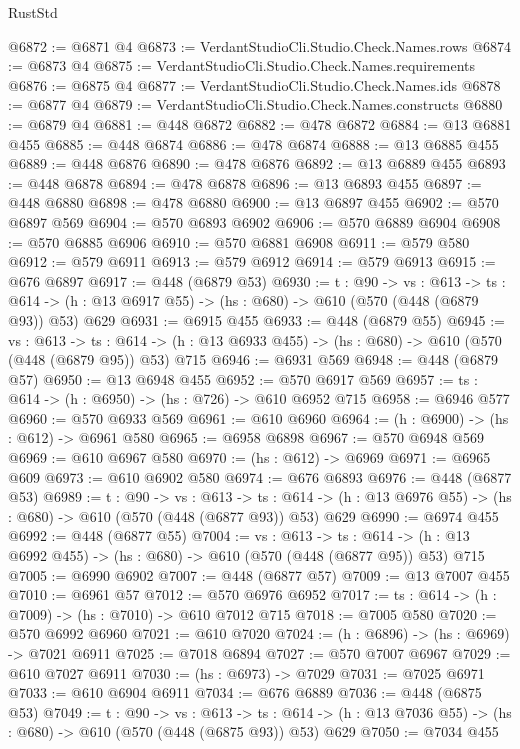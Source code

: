 \begin{lexlean}{RustStd}
\begin{coremodule}
@6872 := @6871 @4
@6873 := VerdantStudioCli.Studio.Check.Names.rows
@6874 := @6873 @4
@6875 := VerdantStudioCli.Studio.Check.Names.requirements
@6876 := @6875 @4
@6877 := VerdantStudioCli.Studio.Check.Names.ids
@6878 := @6877 @4
@6879 := VerdantStudioCli.Studio.Check.Names.constructs
@6880 := @6879 @4
@6881 := @448 @6872
@6882 := @478 @6872
@6884 := @13 @6881 @455
@6885 := @448 @6874
@6886 := @478 @6874
@6888 := @13 @6885 @455
@6889 := @448 @6876
@6890 := @478 @6876
@6892 := @13 @6889 @455
@6893 := @448 @6878
@6894 := @478 @6878
@6896 := @13 @6893 @455
@6897 := @448 @6880
@6898 := @478 @6880
@6900 := @13 @6897 @455
@6902 := @570 @6897 @569
@6904 := @570 @6893 @6902
@6906 := @570 @6889 @6904
@6908 := @570 @6885 @6906
@6910 := @570 @6881 @6908
@6911 := @579 @580
@6912 := @579 @6911
@6913 := @579 @6912
@6914 := @579 @6913
@6915 := @676 @6897
@6917 := @448 (@6879 @53)
@6930 := {t : @90} ->
  {vs : @613} ->
  {ts : @614} -> (h : @13 @6917 @55) -> (hs : @680) -> @610 (@570 (@448 (@6879 @93)) @53) @629
@6931 := @6915 @455
@6933 := @448 (@6879 @55)
@6945 := {vs : @613} ->
  {ts : @614} -> (h : @13 @6933 @455) -> (hs : @680) -> @610 (@570 (@448 (@6879 @95)) @53) @715
@6946 := @6931 @569
@6948 := @448 (@6879 @57)
@6950 := @13 @6948 @455
@6952 := @570 @6917 @569
@6957 := {ts : @614} -> (h : @6950) -> (hs : @726) -> @610 @6952 @715
@6958 := @6946 @577
@6960 := @570 @6933 @569
@6961 := @610 @6960
@6964 := (h : @6900) -> (hs : @612) -> @6961 @580
@6965 := @6958 @6898
@6967 := @570 @6948 @569
@6969 := @610 @6967 @580
@6970 := (hs : @612) -> @6969
@6971 := @6965 @609
@6973 := @610 @6902 @580
@6974 := @676 @6893
@6976 := @448 (@6877 @53)
@6989 := {t : @90} ->
  {vs : @613} ->
  {ts : @614} -> (h : @13 @6976 @55) -> (hs : @680) -> @610 (@570 (@448 (@6877 @93)) @53) @629
@6990 := @6974 @455
@6992 := @448 (@6877 @55)
@7004 := {vs : @613} ->
  {ts : @614} -> (h : @13 @6992 @455) -> (hs : @680) -> @610 (@570 (@448 (@6877 @95)) @53) @715
@7005 := @6990 @6902
@7007 := @448 (@6877 @57)
@7009 := @13 @7007 @455
@7010 := @6961 @57
@7012 := @570 @6976 @6952
@7017 := {ts : @614} -> (h : @7009) -> (hs : @7010) -> @610 @7012 @715
@7018 := @7005 @580
@7020 := @570 @6992 @6960
@7021 := @610 @7020
@7024 := (h : @6896) -> (hs : @6969) -> @7021 @6911
@7025 := @7018 @6894
@7027 := @570 @7007 @6967
@7029 := @610 @7027 @6911
@7030 := (hs : @6973) -> @7029
@7031 := @7025 @6971
@7033 := @610 @6904 @6911
@7034 := @676 @6889
@7036 := @448 (@6875 @53)
@7049 := {t : @90} ->
  {vs : @613} ->
  {ts : @614} -> (h : @13 @7036 @55) -> (hs : @680) -> @610 (@570 (@448 (@6875 @93)) @53) @629
@7050 := @7034 @455

\end{coremodule}
\end{lexlean}
